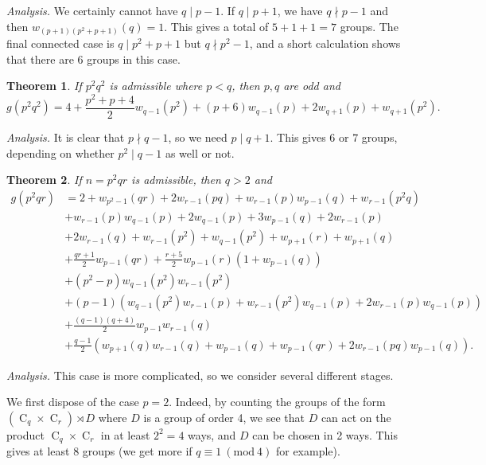 \documentclass[draft]{article}
\newcommand{\cyc}[1]{\operatorname{C}_{#1}}
\newcommand{\Mod}[1]{\ (\mathrm{mod} \ #1)}
\theoremstyle{plain}
\newtheorem{fact}{Theorem}[section]
\theoremstyle{definition}
\begin{document}
\textit{Analysis.} We certainly cannot have $q \mid p - 1$. If $q \mid p + 1$, we have $q \nmid p - 1$ and then $w_{(p + 1)(p^2 + p + 1)}(q) = 1$. This gives a total of $5 + 1 + 1 = 7$ groups. The final connected case is $q \mid p^2 + p + 1$ but $q \nmid p^2 - 1$, and a short calculation shows that there are 6 groups in this  case.

\begin{fact}
	If $p^2 q^2$ is admissible where $p < q$, then $p, q$ are odd and
	\[g(p^2 q^2) = 4 + \frac{p^2 + p + 4}{2} w_{q - 1}(p^2) + (p + 6)w_{q - 1}(p) + 2w_{q + 1}(p) + w_{q + 1}(p^2).\]
\end{fact}

\textit{Analysis.} It is clear that $p \nmid q - 1$, so we need $p \mid q + 1$. This gives 6 or 7 groups, depending on whether $p^2 \mid q - 1$ as well or not.

\begin{fact} 
	If $n = p^2 q r$ is admissible, then $q > 2$ and $$\begin{aligned}
		g(p^2 q r) &= 2 + w_{p^2 - 1}(qr) + 2w_{r - 1}(pq) + w_{r - 1}(p)w_{p - 1}(q) + w_{r - 1}(p^2 q) \\ &+ w_{r - 1}(p)w_{q - 1}(p) + 2w_{q - 1}(p) + 3w_{p - 1}(q) + 2w_{r - 1}(p) \\ &+ 2w_{r - 1}(q) + w_{r - 1}(p^2) + w_{q - 1}(p^2) + w_{p + 1}(r) + w_{p + 1}(q) \\ &+ \frac{qr + 1}{2} w_{p - 1}(qr) + \frac{r + 5}{2} w_{p - 1}(r)(1 + w_{p - 1}(q)) \\ &+ (p^2 - p)w_{q - 1}(p^2)w_{r - 1}(p^2) \\ &+ (p - 1)(w_{q - 1}(p^2)w_{r - 1}(p) + w_{r - 1}(p^2)w_{q - 1}(p) + 2w_{r - 1}(p)w_{q - 1}(p)) \\ &+ \frac{(q - 1)(q + 4)}{2} w_{p - 1}w_{r - 1}(q) \\ &+ \frac{q - 1}{2} (w_{p + 1}(q)w_{r - 1}(q) + w_{p - 1}(q) + w_{p - 1}(qr) + 2w_{r - 1}(pq)w_{p - 1}(q)).
	\end{aligned}$$
\end{fact}

\textit{Analysis.} This case is more complicated, so we consider several different stages.

We first dispose of the case $p = 2$. Indeed, by counting the groups of the form $(\cyc{q} \times \cyc{r}) \rtimes D$ where $D$ is a group of order 4, we see that $D$ can act on the product $\cyc{q} \times \cyc{r}$ in at least $2^2 = 4$ ways, and $D$ can be chosen in 2 ways. This gives at least 8 groups (we get more if $q \equiv 1 \Mod{4}$ for example).
\end{document}

